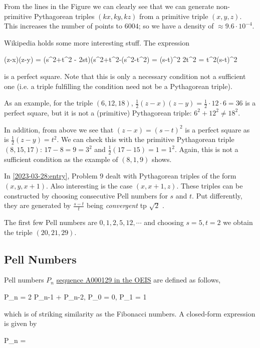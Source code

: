 From the lines in the Figure we can clearly see that we can generate non-primitive Pythagorean triples $(kx, ky, kz)$ from a primitive triple $(x,y,z)$. This increases the number of points to $6004$; so we have a density of $\approx 9.6 \cdot 10^{-4}$.

Wikipedia holds some more interesting stuff. The expression

\bee
{}(z-x)(z-y) = (s^2+t^2 - 2st)(s^2+t^2-(s^2-t^2) =  (s-t)^2 2t^2 = t^2(s-t)^2
\eee

is a perfect square. Note that this is only a necessary condition not a sufficient one (i.e. a triple fulfilling the condition need not be a Pythagorean triple).

As an example, for the triple $(6, 12, 18)$, $\frac{1}{2}(z-x)(z-y) = \frac{1}{2} \cdot 12 \cdot 6 = 36$ is a perfect square, but it is not a (primitive) Pythagorean triple: $6^2 + 12^2 \neq 18^2$.

In addition, from above we see that $(z-x) = (s-t)^2$ is a perfect square as is $\frac{1}{2}(z-y) = t^2$. We can check this with the primitive Pythagorean triple $(8, 15, 17)$: $17 - 8 = 9 = 3^2$ and $\frac{1}{2} (17-15) = 1 = 1^2$. Again, this is not a sufficient condition as the example of $(8, 1, 9)$ shows.

In \ref{2023-03-28:entry}, Problem $9$ dealt with Pythagorean triples of the form $(x, y, x+1)$. Also interesting is the case $(x, x+1, z)$. These triples can be constructed by choosing consecutive Pell numbers for $s$ and $t$. Put differently, they are generated by $\frac{s-t}{t}$ being \emph{convergent} tp $\sqrt{2}$ .

The first few Pell numbers are $0, 1, 2, 5, 12, \cdots$ and choosing $s = 5, t=2$ we obtain the triple $(20, 21, 29)$.

\subsection{Pell Numbers}

Pell numbers $P_n$ \href{https://oeis.org/A000129}{sequence A000129 in the OEIS} are defined as follows,

\bee
P_n = 2 P_{n-1} + P_{n-2}, \quad P_0 = 0, P_1 = 1
\eee

which is of striking similarity as the Fibonacci numbers. A closed-form expression is given by

\bee
P_n = 
\eee


